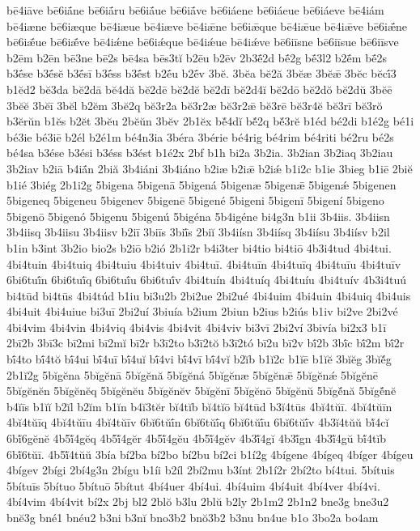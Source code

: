 {bē4iāve
bē6iā́ne
bē6iā́ru
bē6iā́ue
bē6iā́ve
bē6iáene
bē6iáeue
bē6iáeve
bē4iám
bē4iæne
bē6iæque
bē4iæue
bē4iæve
bē4iǣne
bē6iǣque
bē4iǣue
bē4iǣve
bē6iǣ́ne
bē6iǣ́ue
bē6iǣ́ve
bē4iǽne
bē6iǽque
bē4iǽue
bē4iǽve
bē6iīsne
bē6iīsue
bē6iīsve
b2ēm
b2ēn
bē3ne
bē2s
bē4sa
bēs3tĭ
b2ēu
b2ēv
2b3ḗ2d
bḗ2g
bḗ3l2
b2ḗm
bḗ2s
b3ḗse
b3ḗsĕ
b3ḗsī
b3ḗss
b3ḗst
b2ḗu
b2ḗv
3bĕ.
3bĕa
bĕ2ă
3bĕæ
3bĕǣ
3bĕc
bĕcī́3
b1ĕd2
bĕ3da
bĕ2dā
bĕ4dă
bĕ2dē
bĕ2dĕ
bĕ2dī
bĕ2d4ĭ
bĕ2dō
bĕ2dŏ
bĕ2dŭ
3bĕē
3bĕĕ
3bĕī
3bĕl
b2ĕm
3bĕ2q
bĕ3r2a
bĕ3r2æ
bĕ3r2ǣ
bĕ3rē
bĕ3r4ĕ
bĕ3rī
bĕ3rŏ
b3ĕrŭn
b1ĕs
b2ĕt
3bĕu
2bĕŭn
3bĕv
2b1ĕx
bĕ́4dĭ
bĕ́2q
bĕ́3rĕ
b1éd
bé2di
b1é2g
bé1i
bé3ie
bé3iē
b2él
b2é1m
bé4n3ia
3béra
3bérie
bé4rig
bé4rim
bé4riti
bé2ru
bé2s
bé4sa
b3ése
b3ési
b3éss
b3ést
b1é2x
2bf
b1h
bi2a
3b2ia.
3b2ian
3b2iaq
3b2iau
3b2iav
b2iā
b4iā́n
2biă
3b4iáni
3b4iáno
b2iæ
b2iǣ
b2iǽ
b1i2c
b1ie
3bieg
b1iē
2biĕ
b1ié
3biég
2b1i2g
5bigena
5bigenā
5bigená
5bigenæ
5bigenǣ
5bigenǽ
5bigenen
5bigeneq
5bigeneu
5bigenev
5bigenē
5bigené
5bigeni
5bigenī
5bigení
5bigeno
5bigenō
5bigenó
5bigenu
5bigenú
5bigéna
5b4igéne
bi4g3n
b1ii
3b4iis.
3b4iisn
3b4iisq
3b4iisu
3b4iisv
b2iī
3biīs
3biī́s
2biĭ
3b4iísn
3b4iísq
3b4iísu
3b4iísv
b2il
b1in
b3int
3b2io
bio2s
b2iō
b2ió
2b1i2r
b4i3ter
bi4tio
bi4tiō
4b3i4tud
4bi4tui.
4bi4tuin
4bi4tuiq
4bi4tuiu
4bi4tuiv
4bi4tuī.
4bi4tuīn
4bi4tuīq
4bi4tuīu
4bi4tuīv
6bi6tuī́n
6bi6tuī́q
6bi6tuī́u
6bi6tuī́v
4bi4tuín
4bi4tuíq
4bi4tuíu
4bi4tuív
4b3i4tuú
bi4tūd
bi4tūs
4bi4túd
b1iu
bi3u2b
2bi2ue
2bi2ué
4bi4uim
4bi4uin
4bi4uiq
4bi4uis
4bi4uit
4bi4uiue
bi3uī
2bi2uí
3biuía
b2ium
2biun
b2ius
b2iús
b1iv
bi2ve
2bi2vé
4bi4vim
4bi4vin
4bi4viq
4bi4vis
4bi4vit
4bi4viv
bi3vī
2bi2ví
3bivía
bi2x3
b1ī
2bī2b
3bī3c
bī2mi
bī2mĭ
bī2r
b3ī2to
b3ī2tŏ
b3ī2tó
bī2u
bī2v
bī́2b
3bī́c
bī́2m
bī́2r
bī́4to
bī́4tŏ
bī́4ui
bī́4uī
bī́4uĭ
bī́4vi
bī́4vī
bī́4vĭ
b2ĭb
b1ĭ2c
b1ĭē
b1ĭĕ
3bĭĕg
3bĭĕ́g
2b1ĭ2g
5bĭgĕna
5bĭgĕnā
5bĭgĕnă
5bĭgĕná
5bĭgĕnæ
5bĭgĕnǣ
5bĭgĕnǽ
5bĭgĕnē
5bĭgĕnĕn
5bĭgĕnĕq
5bĭgĕnĕu
5bĭgĕnĕv
5bĭgĕnī
5bĭgĕnō
5bĭgĕnŭ
5bĭgĕ́nă
5bĭgĕ́nĕ
b4ĭīs
b1ĭĭ
b2ĭl
b2ĭm
b1ĭn
b4ĭ3tĕr
bĭ4tĭb
bĭ4tĭō
bĭ4tūd
b3ĭ4tūs
4bĭ4tŭī.
4bĭ4tŭīn
4bĭ4tŭīq
4bĭ4tŭīu
4bĭ4tŭīv
6bĭ6tŭī́n
6bĭ6tŭī́q
6bĭ6tŭī́u
6bĭ6tŭī́v
4b3ĭ4tŭŭ
bĭ́4cĭ
6bĭ́6gĕnĕ
4b5ĭ́4gĕq
4b5ĭ́4gĕr
4b5ĭ́4gĕu
4b5ĭ́4gĕv
4b3ĭ́4gĭ
4b3ĭ́gn
4b3ĭ́4gŭ
bĭ́4tĭb
6bĭ́6tŭī.
4b5ĭ́4tŭŭ
3bía
bí2ba
bí2bo
bí2bu
bí2ci
b1í2g
4bígene
4bígeq
4bíger
4bígeu
4bígev
2bígi
2bí4g3n
2bígu
b1íi
b2íl
2bí2mu
b3ínt
2b1í2r
2bí2to
bí4tui.
5bítuis
5bítuīs
5bítuo
5bítuō
5bítut
4bí4uer
4bí4ui.
4bí4uim
4bí4uit
4bí4ver
4bí4vi.
4bí4vim
4bí4vit
bí2x
2bj
bl2
2blŏ
b3lu
2blŭ
b2ly
2b1m2
2b1n2
bne3g
bne3u2
bnĕ3g
bné1
bnéu2
b3ni
b3nĭ
bno3b2
bnŏ3b2
b3nu
bn4ue
b1o
3bo2a
bo4am
}
